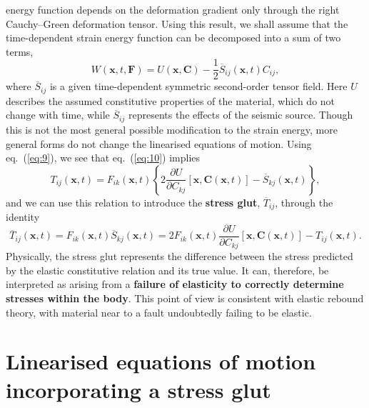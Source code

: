 energy function depends on the deformation gradient only through the right 
Cauchy--Green deformation tensor. Using this result, we shall assume that the time-dependent strain energy function can be decomposed 
into a sum of two terms,
\begin{equation}\label{eq:10}
W(\mathbf{x}, t, \mathbf{F}) = U(\mathbf{x}, \mathbf{C}) - \frac{1}{2}\overline{S}_{ij}(\mathbf{x}, t)C_{ij},
\end{equation}
where $\overline{S}_{ij}$ is a given time-dependent symmetric second-order tensor field. Here $U$ describes the assumed constitutive 
properties of the material, which do not change with time, while $\overline{S}_{ij}$ represents the effects of the seismic source. 
Though this is not the most general possible modification to the strain energy,
more general forms do not change the linearised equations of motion. Using eq.~(\ref{eq:9}), we see that eq.~(\ref{eq:10}) implies
\begin{equation}\label{eq:11}
T_{ij}(\mathbf{x}, t) = F_{ik}(\mathbf{x}, t)\left\{2\frac{\partial U}{\partial C_{kj}}[\mathbf{x}, \mathbf{C}(\mathbf{x}, t)] - 
\overline{S}_{kj}(\mathbf{x}, t)\right\},
\end{equation}
and we can use this relation to introduce the \textbf{stress glut}, $\overline{T}_{ij}$, through the identity
\begin{equation}\label{eq:12}
\overline{T}_{ij}(\mathbf{x}, t) = F_{ik}(\mathbf{x}, t)\overline{S}_{kj}(\mathbf{x}, t) = 2F_{ik}(\mathbf{x}, t)
\frac{\partial U}{\partial C_{kj}}[\mathbf{x}, \mathbf{C}(\mathbf{x}, t)] - T_{ij}(\mathbf{x}, t).
\end{equation}
Physically, the stress glut represents the difference between the stress predicted by the elastic constitutive relation 
and its true value. It can, therefore, be interpreted as arising 
from a \textbf{failure of elasticity to correctly determine stresses within the body}. This point of view is consistent with 
elastic rebound theory, with material near to a fault undoubtedly failing to be elastic.

\section*{Linearised equations of motion incorporating a stress glut}

